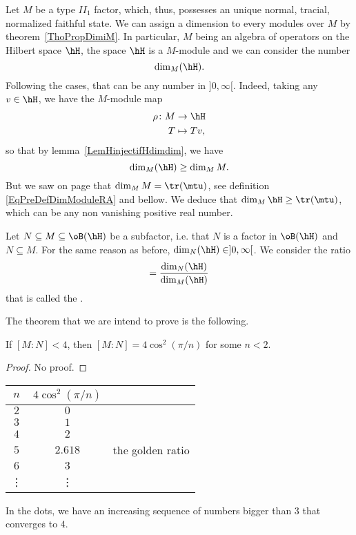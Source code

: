 Let $M$ be a type $II_1$ factor, which, thus, possesses an unique normal, tracial, normalized faithful state. We can assign a dimension to every modules over $M$ by theorem~\ref{ThoPropDimiM}. In particular, $M$ being an algebra of operators on the Hilbert space $\hH$, the space $\hH$ is a $M$-module and we can consider the number
\begin{equation}
	\dim_M(\hH).
\end{equation}
Following the cases, that can be any number in $]0,\infty[$. Indeed, taking any $v\in\hH$, we have the $M$-module map
\begin{equation}
\begin{aligned}
 \rho\colon M&\to \hH \\
   T&\mapsto Tv ,
\end{aligned}
\end{equation}
so that by lemma~\ref{LemHinjectifHdimdim}, we have
\begin{equation}
	\dim_M(\hH)\geq\dim_MM.
\end{equation}
But we saw on page \pageref{subsubsecExemDimMMMod} that $\dim_MM=\tr(\mtu)$, see definition \eqref{EqPreDefDimModuleRA} and bellow. We deduce that $\dim_M\hH\geq \tr(\mtu)$, which can be any non vanishing positive real number.

Let $N\subseteq M\subseteq \oB(\hH)$ be a subfactor, i.e. that $N$ is a factor in $\oB(\hH)$ and $N\subseteq M$. For the same reason as before, $\dim_N(\hH)\in]0,\infty[$. We consider the ratio
\begin{equation}
	[M:N]=\frac{ \dim_N(\hH) }{ \dim_M(\hH) }
\end{equation}
that is called the .

The theorem that we are intend to prove is the following.
\begin{theorem}[Jones]
If $[M:N]<4$, then $[M:N]=4\cos^2(\pi/n)$ for some $n<2$.
\end{theorem}

\begin{proof}
No proof.
\end{proof}

\begin{center}
\begin{tabular}{ccr}
	$n$		&	$4\cos^2(\pi/n)$\\
\hline
	$2$		&	$0$\\
	$3$		&	$1$\\
	$4$		&	$2$\\
	$5$		&	$2.618$		& the golden ratio\\
	$6$		&	$3$\\
	\vdots		&	\vdots
\end{tabular}
\end{center}
In the dots, we have an increasing sequence of numbers bigger than $3$ that converges to $4$.

